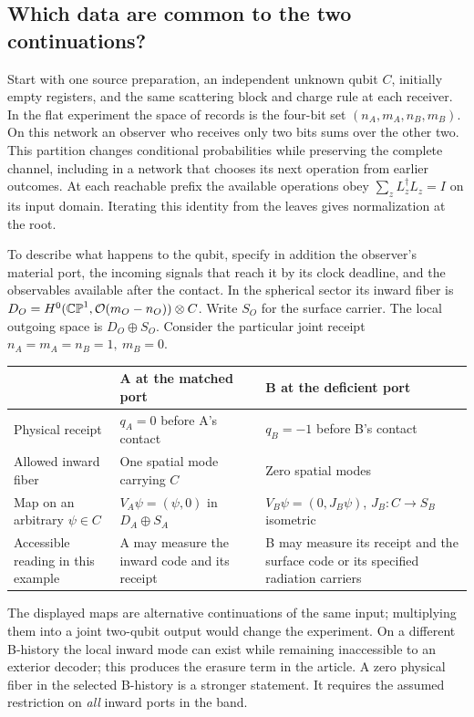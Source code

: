 \subsection{Which data are common to the two continuations?}\label{sec:suppdom}
Start with one source preparation, an independent unknown qubit \(C\), initially empty registers, and the same scattering block and charge rule at each receiver. In the flat experiment the space of records is the four-bit set \((n_A,m_A,n_B,m_B)\). On this network an observer who receives only two bits sums over the other two. This partition changes conditional probabilities while preserving the complete channel, including in a network that chooses its next operation from earlier outcomes. At each reachable prefix the available operations obey \(\sum_z L_z^\dagger L_z=I\) on its input domain. Iterating this identity from the leaves gives normalization at the root.

To describe what happens to the qubit, specify in addition the observer's material port, the incoming signals that reach it by its clock deadline, and the observables available after the contact. In the spherical sector its inward fiber is \(D_O=H^0(\mathbb{CP}^1,{\cal O}(m_O-n_O))\otimes C\). Write \(S_O\) for the surface carrier. The local outgoing space is \(D_O\oplus S_O\). Consider the particular joint receipt \(n_A=m_A=n_B=1,\ m_B=0\).
\begin{center}\small
\begin{tabularx}{\linewidth}{@{}lXX@{}}\toprule
 & A at the matched port & B at the deficient port\\\midrule
Physical receipt & \(q_A=0\) before A's contact & \(q_B=-1\) before B's contact\\
Allowed inward fiber & One spatial mode carrying \(C\) & Zero spatial modes\\
Map on an arbitrary \(\psi\in C\) & \(V_A\psi=(\psi,0)\) in \(D_A\oplus S_A\) & \(V_B\psi=(0,J_B\psi)\), \(J_B:C\to S_B\) isometric\\
Accessible reading in this example & A may measure the inward code and its receipt & B may measure its receipt and the surface code or its specified radiation carriers\\
\bottomrule\end{tabularx}
\end{center}
The displayed maps are alternative continuations of the same input; multiplying them into a joint two-qubit output would change the experiment. On a different B-history the local inward mode can exist while remaining inaccessible to an exterior decoder; this produces the erasure term in the article. A zero physical fiber in the selected B-history is a stronger statement. It requires the assumed restriction on \emph{all} inward ports in the band.

